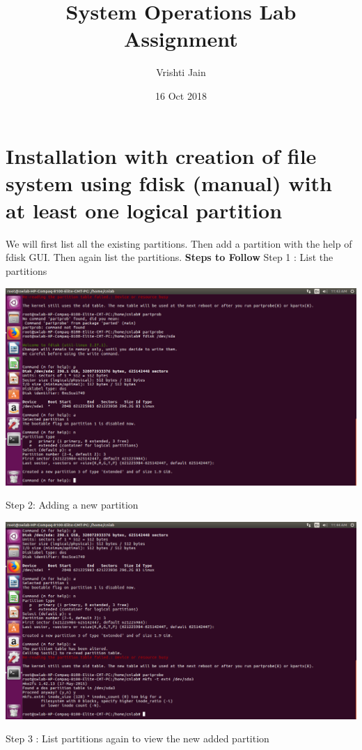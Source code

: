 \documentclass{article}
\title{System Operations Lab \newline Assignment}
\author{Vrishti Jain}
\date{16 Oct 2018}
\begin{document}
\maketitle

\section{Installation with creation of file system using
fdisk (manual) with at least one logical partition}

We will first list all the existing partitions. Then add a partition with the help of fdisk GUI. Then again list the partitions.
\newline
\newline
\textbf{Steps to Follow} 
\newline
Step 1 : List the partitions
\newline

\begin{center}
\includegraphics[scale=0.2]{partison1.png}
\end{center}
Step 2: Adding a new partition
\newline
\begin{center}
\includegraphics[scale=0.2]{PARTISON2.png}
\end{center}
Step 3 : List partitions again to view the new added partition
\end{document}

